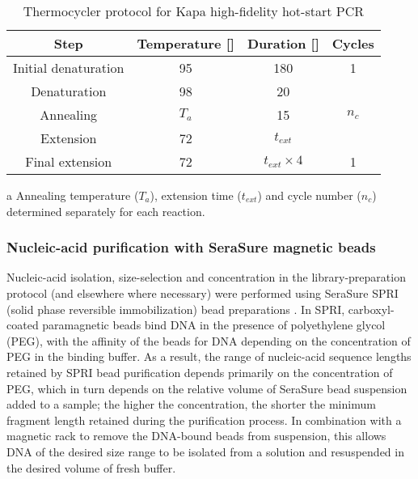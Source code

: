 \begin{table}[h]
\centering
\caption{Thermocycler protocol for Kapa high-fidelity hot-start PCR}
\label{tab:kapa}
\begin{threeparttable}
\begin{tabular}{cccc}\toprule
\textbf{Step} & \textbf{Temperature [\degC{}]} & \textbf{Duration [\secs{}]} & \textbf{Cycles}\\\midrule
Initial denaturation & 95 & 180 & 1 \\\midrule
Denaturation & 98 & 20 & \multirow{3}{*}{$n_c$\tnote{a}}\\
Annealing & $T_a$\tnote{a} \tnote{} & 15 & \\
Extension & 72 & $t_{ext}$\tnote{a} & \\\midrule
Final extension & 72 & $t_{ext} \times 4$\tnote{a} & 1\\
\bottomrule\end{tabular}
\begin{tablenotes}
\item[a] Annealing temperature ($T_a$), extension time ($t_{ext}$) and cycle number ($n_c$) determined separately for each reaction.
\end{tablenotes}
\end{threeparttable}
\end{table}

\subsubsection{Nucleic-acid purification with SeraSure magnetic beads}
\label{sec:methods_molec_standard_serasure}

Nucleic-acid isolation, size-selection and concentration in the \igseq library-preparation protocol (and elsewhere where necessary) were performed using SeraSure SPRI (solid phase reversible immobilization) bead preparations \parencite{hawkins1994spri,deangelis1995spri,lennon2010cleanup,fisher2011cleanup}. In SPRI, carboxyl-coated paramagnetic beads bind DNA in the presence of polyethylene glycol (PEG), with the affinity of the beads for DNA depending on the concentration of PEG in the binding buffer. As a result, the range of nucleic-acid sequence lengths retained by SPRI bead purification depends primarily on the concentration of PEG, which in turn depends on the relative volume of SeraSure bead suspension added to a sample; the higher the concentration, the shorter the minimum fragment length retained during the purification process. In combination with a magnetic rack to remove the DNA-bound beads from suspension, this allows DNA of the desired size range to be isolated from a solution and resuspended in the desired volume of fresh buffer.

